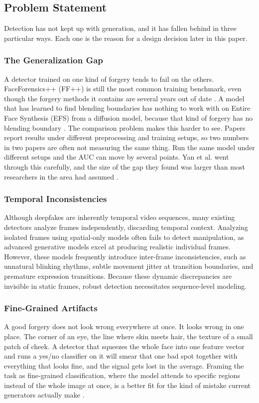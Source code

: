 \subsection{Problem Statement}
Detection has not kept up with generation, and it has fallen behind in three particular ways. Each one is the reason for a design decision later in this paper.

\subsubsection{The Generalization Gap}
A detector trained on one kind of forgery tends to fail on the others. FaceForensics++ (FF++) is still the most common training benchmark, even though the forgery methods it contains are several years out of date \citep{roessler2019faceforensicspp, Yan2023DeepfakeBench}. A model that has learned to find blending boundaries has nothing to work with on Entire Face Synthesis (EFS) from a diffusion model, because that kind of forgery has no blending boundary \citep{Yan2024DF40}. The comparison problem makes this harder to see. Papers report results under different preprocessing and training setups, so two numbers in two papers are often not measuring the same thing. Run the same model under different setups and the AUC can move by several points. Yan et al. went through this carefully, and the size of the gap they found was larger than most researchers in the area had assumed \citep{Deng2025DeepfakeEval}.

\subsubsection{Temporal Inconsistencies}
Although deepfakes are inherently temporal video sequences, many existing detectors analyze frames independently, discarding temporal context. Analyzing isolated frames using spatial-only models often fails to detect manipulation, as advanced generative models excel at producing realistic individual frames. However, these models frequently introduce inter-frame inconsistencies, such as unnatural blinking rhythms, subtle movement jitter at transition boundaries, and premature expression transitions. Because these dynamic discrepancies are invisible in static frames, robust detection necessitates sequence-level modeling.

\subsubsection{Fine-Grained Artifacts}
A good forgery does not look wrong everywhere at once. It looks wrong in one place. The corner of an eye, the line where skin meets hair, the texture of a small patch of cheek. A detector that squeezes the whole face into one feature vector and runs a yes/no classifier on it will smear that one bad spot together with everything that looks fine, and the signal gets lost in the average. Framing the task as fine-grained classification, where the model attends to specific regions instead of the whole image at once, is a better fit for the kind of mistake current generators actually make \citep{Zhao2021MultiAttentional, Chen2024FreqNet}.

